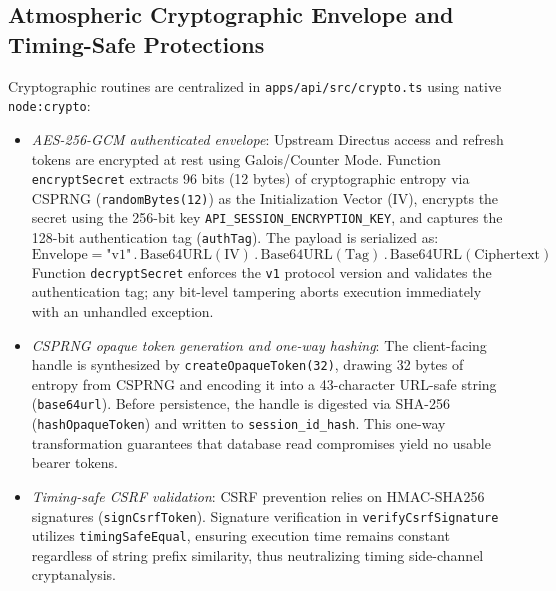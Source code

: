 \subsection{Atmospheric Cryptographic Envelope and Timing-Safe Protections}
Cryptographic routines are centralized in \texttt{apps/api/src/crypto.ts} using native \texttt{node:crypto}:
\begin{itemize}
    \item[-] \textit{AES-256-GCM authenticated envelope}: Upstream Directus access and refresh tokens are encrypted at rest using Galois/Counter Mode. Function \texttt{encryptSecret} extracts 96 bits (12 bytes) of cryptographic entropy via CSPRNG (\texttt{randomBytes(12)}) as the Initialization Vector (IV), encrypts the secret using the 256-bit key \texttt{API\_SESSION\_ENCRYPTION\_KEY}, and captures the 128-bit authentication tag (\texttt{authTag}). The payload is serialized as:
    \begin{equation}
    \label{eq:crypto_envelope_en}
    \text{Envelope} = \text{"v1"} \,.\, \text{Base64URL}(\text{IV}) \,.\, \text{Base64URL}(\text{Tag}) \,.\, \text{Base64URL}(\text{Ciphertext})
    \end{equation}
    Function \texttt{decryptSecret} enforces the \texttt{v1} protocol version and validates the authentication tag; any bit-level tampering aborts execution immediately with an unhandled exception.
    \item[-] \textit{CSPRNG opaque token generation and one-way hashing}: The client-facing handle is synthesized by \texttt{createOpaqueToken(32)}, drawing 32 bytes of entropy from CSPRNG and encoding it into a 43-character URL-safe string (\texttt{base64url}). Before persistence, the handle is digested via SHA-256 (\texttt{hashOpaqueToken}) and written to \texttt{session\_id\_hash}. This one-way transformation guarantees that database read compromises yield no usable bearer tokens.
    \item[-] \textit{Timing-safe CSRF validation}: CSRF prevention relies on HMAC-SHA256 signatures (\texttt{signCsrfToken}). Signature verification in \texttt{verifyCsrfSignature} utilizes \texttt{timingSafeEqual}, ensuring execution time remains constant regardless of string prefix similarity, thus neutralizing timing side-channel cryptanalysis.
\end{itemize}

